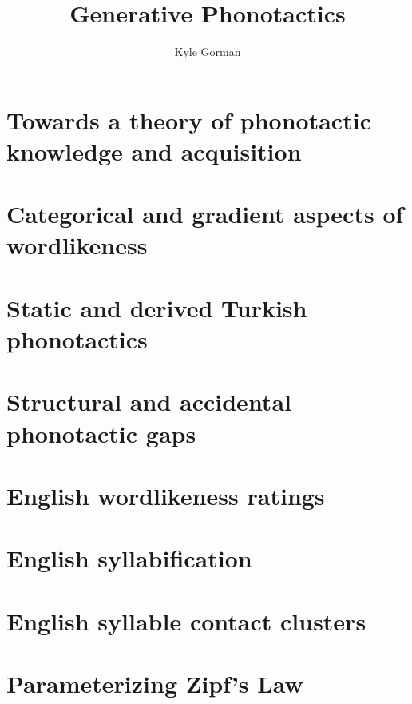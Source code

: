 \documentclass{upenndiss}
\title{Generative Phonotactics}
\author{Kyle Gorman}
\begin{document}
\FrontMatter

\chapter{Towards a theory of phonotactic knowledge and acquisition}

\chapter{Categorical and gradient aspects of wordlikeness}

\chapter{Static and derived Turkish phonotactics} 

\chapter{Structural and accidental phonotactic gaps} 


\appendix 
\renewcommand{\arraystretch}{0.25}

\chapter{English wordlikeness ratings}


\chapter{English syllabification}


\chapter{English syllable contact clusters}


\chapter{Parameterizing Zipf's Law}




\end{document}
